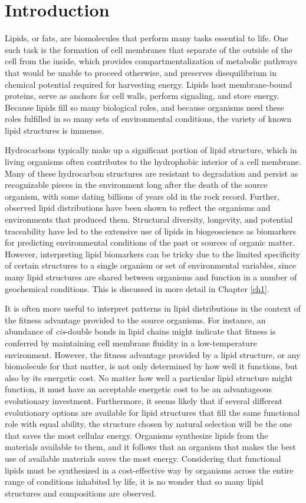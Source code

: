 \chapter{Introduction}


Lipids, or fats, are biomolecules that perform many tasks essential to life. One such task is the formation of cell membranes that separate of the outside of the cell from the inside, which provides compartmentalization of metabolic pathways that would be unable to proceed otherwise, and preserves disequilibrium in chemical potential required for harvesting energy. Lipids host membrane-bound proteins, serve as anchors for cell walls, perform signaling, and store energy. Because lipids fill so many biological roles, and because organisms need these roles fulfilled in so many sets of environmental conditions, the variety of known lipid structures is immense.

Hydrocarbons typically make up a significant portion of lipid structure, which in living organisms often contributes to the hydrophobic interior of a cell membrane. Many of these hydrocarbon structures are resistant to degradation and persist as recognizable pieces in the environment long after the death of the source organism, with some dating billions of years old in the rock record. Further, observed lipid distributions have been shown to reflect the organisms and environments that produced them. Structural diversity, longevity, and potential traceability have led to the extensive use of lipids in biogeoscience as biomarkers for predicting environmental conditions of the past or sources of organic matter. However, interpreting lipid biomarkers can be tricky due to the limited specificity of certain structures to a single organism or set of environmental variables, since many lipid structures are shared between organisms and function in a number of geochemical conditions. This is discussed in more detail in Chapter \ref{ch1}.

It is often more useful to interpret patterns in lipid distributions in the context of the fitness advantage provided to the source organisms. For instance, an abundance of \textit{cis}-double bonds in lipid chains might indicate that fitness is conferred by maintaining cell membrane fluidity in a low-temperature environment. However, the fitness advantage provided by a lipid structure, or any biomolecule for that matter, is not only determined by how well it functions, but also by its energetic cost. No matter how well a particular lipid structure might function, it must have an acceptable energetic cost to be an advantageous evolutionary investment. Furthermore, it seems likely that if several different evolutionary options are available for lipid structures that fill the same functional role with equal ability, the structure chosen by natural selection will be the one that saves the most cellular energy. Organisms synthesize lipids from the materials available to them, and it follows that an organism that makes the best use of available materials saves the most energy. Considering that functional lipids must be synthesized in a cost-effective way by organisms across the entire range of conditions inhabited by life, it is no wonder that so many lipid structures and compositions are observed. 

